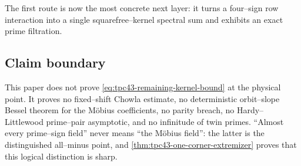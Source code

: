 The first route is now the most concrete next layer: it turns a
four--sign row interaction into a single squarefree--kernel spectral sum
and exhibits an exact prime filtration.

\subsection{Claim boundary}

This paper does not prove \eqref{eq:tpc43-remaining-kernel-bound} at the
physical point.  It proves no fixed--shift Chowla estimate, no
deterministic orbit--slope Bessel theorem for the M\"obius coefficients,
no parity breach, no Hardy--Littlewood prime--pair asymptotic, and no
infinitude of twin primes.  ``Almost every prime--sign field'' never
means ``the M\"obius field'': the latter is the distinguished all--minus
point, and \cref{thm:tpc43-one-corner-extremizer} proves that this
logical distinction is sharp.

